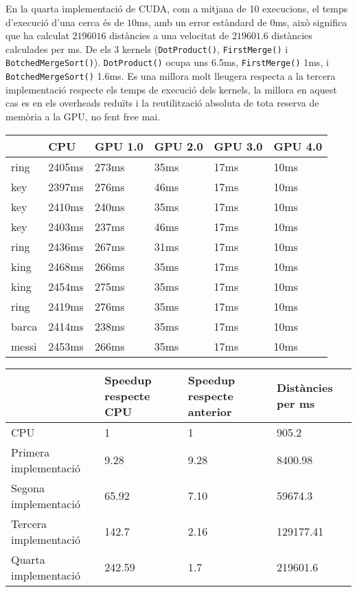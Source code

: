 \documentclass[catalan,10pt,a4paper]{article}
\begin{document}
En la quarta implementació de CUDA, com a mitjana de 10 execucions, el temps d'execució d'una cerca és de $10$ms, amb un error estàndard de $0$ms, això significa que ha calculat $2196016$ distàncies a una velocitat de $219601.6$ distàncies calculades per ms. De els 3 kernels (\verb|DotProduct()|, \verb|FirstMerge()| i \verb|BotchedMergeSort()|). \verb|DotProduct()| ocupa uns 6.5ms, \verb|FirstMerge()| 1ms, i \verb|BotchedMergeSort()| 1.6ms. Es una millora molt lleugera respecta a la tercera implementació respecte els temps de execució dels kernels, la millora en aquest cas es en els overheads reduïts i la reutilització absoluta de tota reserva de memòria a la GPU, no fent free mai.



\begin{table}[h]
\centering
\begin{tabular}{|l|l|l|l|l|l|}
\hline
      & CPU  & GPU 1.0 & GPU 2.0 & GPU 3.0 & GPU 4.0 \\ \hline
ring  & 2405ms & 273ms & 35ms & 17ms & 10ms \\ \hline
key   & 2397ms & 276ms & 46ms & 17ms & 10ms\\ \hline
key   & 2410ms & 240ms & 35ms & 17ms & 10ms\\ \hline
key   & 2403ms & 237ms & 46ms & 17ms & 10ms\\ \hline
ring  & 2436ms & 267ms & 31ms & 17ms & 10ms\\ \hline
king  & 2468ms & 266ms & 35ms & 17ms & 10ms\\ \hline
king  & 2454ms & 275ms & 35ms & 17ms & 10ms\\ \hline
ring  & 2419ms & 276ms & 35ms & 17ms & 10ms\\ \hline
barca & 2414ms & 238ms & 35ms & 17ms & 10ms\\ \hline
messi & 2453ms & 266ms & 35ms & 17ms & 10ms\\ \hline
\end{tabular}
\end{table}




\begin{table}[h]
\centering
\begin{tabular}{|l|l|l|l|}
\hline
      & Speedup respecte CPU & Speedup respecte anterior & Distàncies per ms \\ \hline
CPU & 1 & 1 & 905.2 \\ \hline
Primera implementació & 9.28 & 9.28 & 8400.98 \\ \hline
Segona implementació & 65.92 & 7.10 & 59674.3  \\ \hline
Tercera implementació & 142.7 & 2.16 & 129177.41  \\ \hline
Quarta implementació & 242.59 & 1.7 & 219601.6 \\ \hline

\end{tabular}
\end{table}
\end{document}
